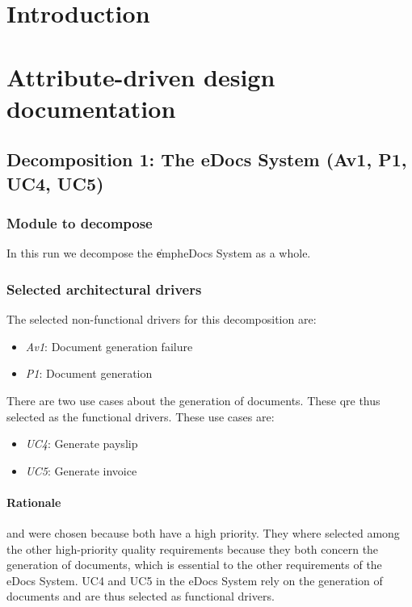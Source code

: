 \documentclass[a4paper,10pt]{article}
\begin{document}


\tableofcontents
\newpage

\section{Introduction}\label{sec:introduction}

\section{Attribute-driven design documentation}\label{sec:add}
\subsection{Decomposition 1: The eDocs System (Av1, P1, UC4, UC5)}
\subsubsection{Module to decompose}
In this run we decompose the \|emph{eDocs System} as a whole.

\subsubsection{Selected architectural drivers}
The selected non-functional drivers for this decomposition are:

\begin{itemize}
    \item \emph{Av1}: Document generation failure
    \item \emph{P1}: Document generation
\end{itemize}

There are two use cases about the generation of documents. These qre thus selected as the functional drivers. These use cases are:

\begin{itemize}
    \item \emph{UC4}: Generate payslip
    \item \emph{UC5}: Generate invoice
\end{itemize}

\paragraph{Rationale}
 and  were chosen because both have a high priority. They where selected among the other high-priority quality requirements because they both concern the generation of documents, which is essential to the other requirements of the eDocs System.
UC4 and UC5 in the eDocs System rely on the generation of documents and are thus selected as functional drivers.
\end{document}
